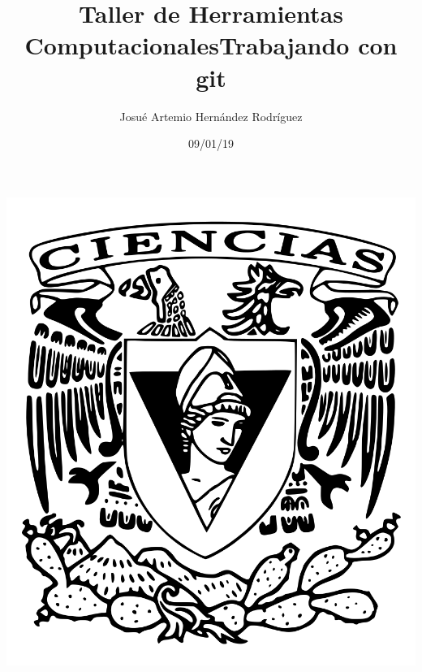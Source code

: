 \documentclass[letterpaper, 12pt, oneside]{article}%
\title{\Huge Taller de Herramientas Computacionales}
\author{Josué Artemio Hernández Rodríguez}%
\date{09/01/19}%
\begin{document}
\maketitle
\begin{center}%
\includegraphics[scale=0.2]{2.png}%
\end{center}%
\newpage%

\title{\Huge Trabajando con git\\}%
\end{document}
